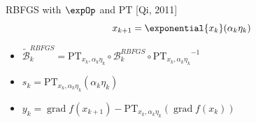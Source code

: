 \documentclass[9.4pt]{beamer}
\begin{document}

\begin{frame}{RBFGS with $\expOp$ and $\mathrm{PT}$}
    \vspace{-1\baselineskip}\hfill{\tiny{[Qi, 2011]}}
    \begin{equation*}
        x_{k+1} = \exponential{x_k}(\alpha_k \eta_k)
    \end{equation*}
    \begin{itemize}
        \item $\widetilde{\mathcal{B}}^{RBFGS}_k = \mathrm{PT}_{x_k, \alpha_k \eta_k} \circ \mathcal{B}^{RBFGS}_k \circ {\mathrm{PT}_{x_k, \alpha_k \eta_k}}^{-1}$
        \item $s_k = \mathrm{PT}_{x_k, \alpha_k \eta_k}(\alpha_k \eta_k)$
        \item $y_k = \operatorname{grad} f(x_{k+1}) - \mathrm{PT}_{x_k, \alpha_k \eta_k}(\operatorname{grad} f(x_k))$
    \end{itemize}
\end{frame}
\end{document}
